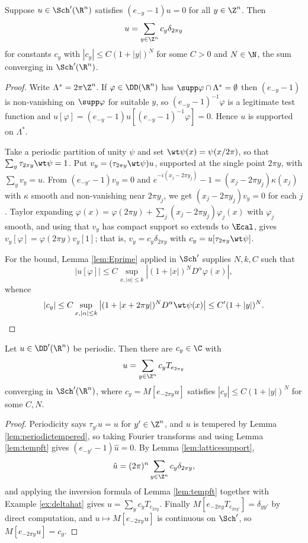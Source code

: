 \begin{lemma}\label{lem:latticesupport}
	Suppose $u\in\Sch'(\R^n)$ satisfies $(e_{-y}-1)u=0$ for all $y\in\Z^n$. Then
	$$u=\sum_{y\in\Z^n}c_y\delta_{2\pi y}$$
	for constants $c_y$ with $|c_y|\le C(1+|y|)^N$ for some $C>0$ and $N\in\N$, the sum converging in $\Sch'(\R^n)$.
\end{lemma}

\begin{proof}
	Write $\Lambda^*=2\pi\Z^n$. If $\varphi\in\DD(\R^n)$ has $\supp\varphi\cap\Lambda^*=\emptyset$ then $(e_{-y}-1)$ is non-vanishing on $\supp\varphi$ for suitable $y$, so $(e_{-y}-1)^{-1}\varphi$ is a legitimate test function and $u[\varphi]=(e_{-y}-1)u[(e_{-y}-1)^{-1}\varphi]=0$. Hence $u$ is supported on $\Lambda^*$.

	Take a periodic partition of unity $\psi$ and set $\wt\psi(x)=\psi(x/2\pi)$, so that $\sum_y\tau_{2\pi y}\wt\psi=1$. Put $v_y=(\tau_{2\pi y}\wt\psi)u$, supported at the single point $2\pi y$, with $\sum_yv_y=u$. From $(e_{-y'}-1)v_y=0$ and $e^{-i(x_j-2\pi y_j)}-1=(x_j-2\pi y_j)\kappa(x_j)$ with $\kappa$ smooth and non-vanishing near $2\pi y_j$, we get $(x_j-2\pi y_j)v_y=0$ for each $j$. Taylor expanding $\varphi(x)=\varphi(2\pi y)+\sum_j(x_j-2\pi y_j)\varphi_j(x)$ with $\varphi_j$ smooth, and using that $v_y$ has compact support so extends to $\Ecal$, gives $v_y[\varphi]=\varphi(2\pi y)v_y[1]$; that is, $v_y=c_y\delta_{2\pi y}$ with $c_y=u[\tau_{2\pi y}\wt\psi]$.

	For the bound, Lemma \ref{lem:Eprime} applied in $\Sch'$ supplies $N,k,C$ such that
	$$|u[\varphi]|\le C\sup_{x,|\alpha|\le k}\left|(1+|x|)^ND^\alpha\varphi(x)\right|,$$
	whence
	$$|c_y|\le C\sup_{x,|\alpha|\le k}\left|(1+|x+2\pi y|)^ND^\alpha\wt\psi(x)\right|\le C'(1+|y|)^N. \qedhere$$
\end{proof}

\begin{theorem}\label{thm:fourierseriesdist}
	Let $u\in\DD'(\R^n)$ be periodic. Then there are $c_y \in \C$ with
	$$u = \sum_{y\in\Z^n}c_yT_{e_{2\pi y}}$$
	converging in $\Sch'(\R^n)$, where $c_y=M[e_{-2\pi y}u]$ satisfies $|c_y|\le C(1+|y|)^N$ for some $C, N$.
\end{theorem}

\begin{proof}
	Periodicity says $\tau_{y'}u=u$ for $y'\in\Z^n$, and $u$ is tempered by Lemma \ref{lem:periodictempered}, so taking Fourier transforms and using Lemma \ref{lem:tempft} gives $(e_{-y'}-1)\hat u=0$. By Lemma \ref{lem:latticesupport},
	$$\hat u = (2\pi)^n\sum_{y\in\Z^n}c_y\delta_{2\pi y},$$
	and applying the inversion formula of Lemma \ref{lem:tempft} together with Example \ref{ex:deltahat} gives $u=\sum_yc_yT_{e_{2\pi y}}$. Finally $M[e_{-2\pi y}T_{e_{2\pi y'}}]=\delta_{yy'}$ by direct computation, and $u\mapsto M[e_{-2\pi y}u]$ is continuous on $\Sch'$, so $M[e_{-2\pi y}u]=c_y$.
\end{proof}

